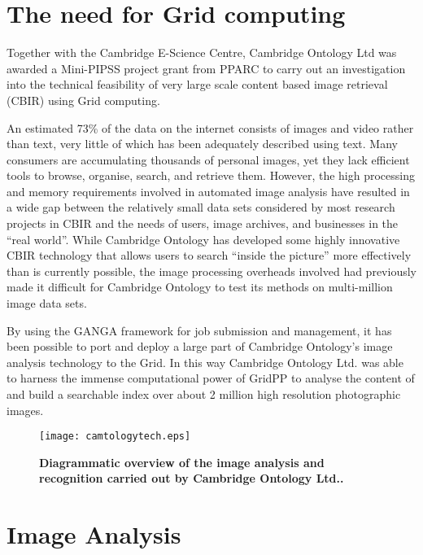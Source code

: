 \documentclass[10pt]{article}
\begin{document}
\section{The need for Grid computing}

Together with the Cambridge E-Science Centre, Cambridge Ontology Ltd was awarded a Mini-PIPSS project grant from PPARC to carry out an investigation into the technical feasibility of very large scale content based image retrieval (CBIR) using Grid computing.

An estimated 73\% of the data on the internet consists of images and video rather than text, very little of which has been adequately described using text. Many consumers are accumulating thousands of personal images, yet they lack efficient tools to browse, organise, search, and retrieve them.
However, the high processing and memory requirements involved in automated image analysis have resulted in a wide gap between the relatively small data sets considered by most research projects in CBIR and the needs of users, image archives, and businesses in the ``real world''. While Cambridge Ontology has developed some highly innovative CBIR technology that allows users to search ``inside the picture'' more effectively than is currently possible, the image processing overheads involved had previously made it difficult for Cambridge Ontology to test its methods on multi-million image data sets.

By using the GANGA framework for job submission and management, it has been possible to port and deploy a large part of Cambridge Ontology's image analysis technology to the Grid. In this way Cambridge Ontology Ltd. was able to harness the immense computational power of GridPP to analyse the content of and build a searchable index over about 2 million high resolution photographic images.


\begin{figure}[htb]
\begin{center}
\texttt{[image: camtologytech.eps]}
\end{center}
\caption[]{\bf Diagrammatic overview of the image analysis and recognition carried out by Cambridge Ontology Ltd..}
\label{f:camtologytech}
\end{figure}


\section{Image Analysis}
\end{document}
